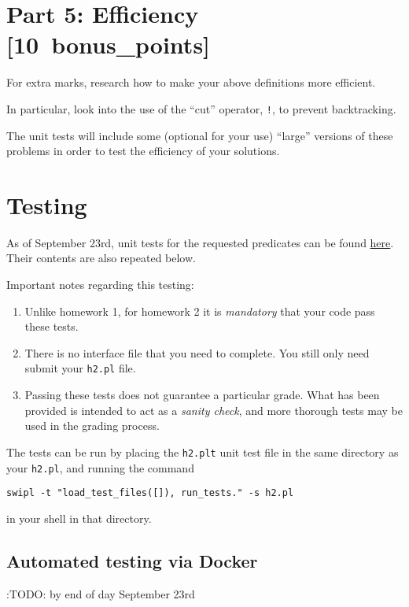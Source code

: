 \documentclass[11pt]{article}
\begin{document}
\section*{Part 5: Efficiency                                     [10 bonus\_points]}
\label{sec:orge4e5c6c}
For extra marks, research how to make your above definitions more efficient.

In particular, look into the use of the “cut” operator, \texttt{!},
to prevent backtracking.

The unit tests will include some (optional for your use) “large”
versions of these problems in order to test the efficiency
of your solutions.

\section*{Testing}
\label{sec:org8f8e3df}
As of September 23rd, unit tests for the requested predicates
can be found \href{./testing/h2/src/h2.plt}{here}. Their contents are also repeated below.

Important notes regarding this testing:
\begin{enumerate}
\item Unlike homework 1, for homework 2 it is \emph{mandatory}
that your code pass these tests.
\item There is no interface file that you need to complete.
You still only need submit your \texttt{h2.pl} file.
\item Passing these tests does not guarantee a particular grade.
What has been provided is intended to act as a \emph{sanity check},
and more thorough tests may be used in the grading process.
\end{enumerate}

The tests can be run by placing the \texttt{h2.plt} unit test file
in the same directory as your \texttt{h2.pl}, and running the command
\begin{verbatim}
swipl -t "load_test_files([]), run_tests." -s h2.pl
\end{verbatim}
in your shell in that directory.

\subsection*{Automated testing via Docker}
\label{sec:org5faa338}
:TODO: by end of day September 23rd
\end{document}
